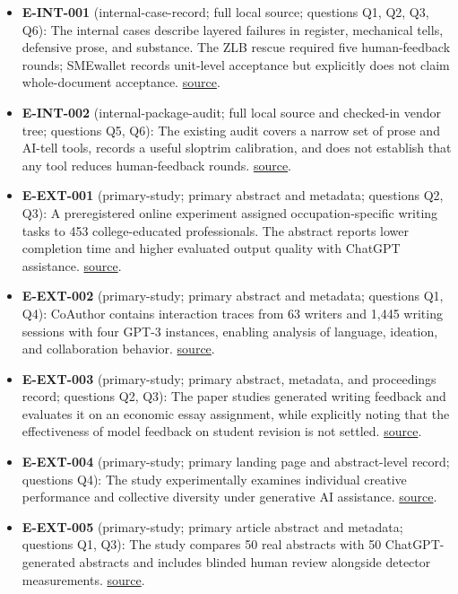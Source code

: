\documentclass[11pt]{article}
\providecommand{\tightlist}{\setlength{\itemsep}{0pt}\setlength{\parskip}{0pt}}
\begin{document}
\begin{itemize}
\tightlist
\item
  \textbf{E-INT-001} (internal-case-record; full local source; questions Q1, Q2, Q3, Q6): The internal cases describe layered failures in register, mechanical tells, defensive prose, and substance. The ZLB rescue required five human-feedback rounds; SMEwallet records unit-level acceptance but explicitly does not claim whole-document acceptance. \href{../part1_failures.tex}{source}.
\item
  \textbf{E-INT-002} (internal-package-audit; full local source and checked-in vendor tree; questions Q5, Q6): The existing audit covers a narrow set of prose and AI-tell tools, records a useful sloptrim calibration, and does not establish that any tool reduces human-feedback rounds. \href{../part4_oss.tex}{source}.
\item
  \textbf{E-EXT-001} (primary-study; primary abstract and metadata; questions Q2, Q3): A preregistered online experiment assigned occupation-specific writing tasks to 453 college-educated professionals. The abstract reports lower completion time and higher evaluated output quality with ChatGPT assistance. \href{https://ui.adsabs.harvard.edu/abs/2023Sci...381..187N/abstract}{source}.
\item
  \textbf{E-EXT-002} (primary-study; primary abstract and metadata; questions Q1, Q4): CoAuthor contains interaction traces from 63 writers and 1,445 writing sessions with four GPT-3 instances, enabling analysis of language, ideation, and collaboration behavior. \href{https://arxiv.org/abs/2201.06796}{source}.
\item
  \textbf{E-EXT-003} (primary-study; primary abstract, metadata, and proceedings record; questions Q2, Q3): The paper studies generated writing feedback and evaluates it on an economic essay assignment, while explicitly noting that the effectiveness of model feedback on student revision is not settled. \href{https://aclanthology.org/2024.emnlp-main.928/}{source}.
\item
  \textbf{E-EXT-004} (primary-study; primary landing page and abstract-level record; questions Q4): The study experimentally examines individual creative performance and collective diversity under generative AI assistance. \href{https://doi.org/10.1126/sciadv.adn5290}{source}.
\item
  \textbf{E-EXT-005} (primary-study; primary article abstract and metadata; questions Q1, Q3): The study compares 50 real abstracts with 50 ChatGPT-generated abstracts and includes blinded human review alongside detector measurements. \href{https://www.nature.com/articles/s41746-023-00819-6}{source}.

\end{itemize}
\end{document}
